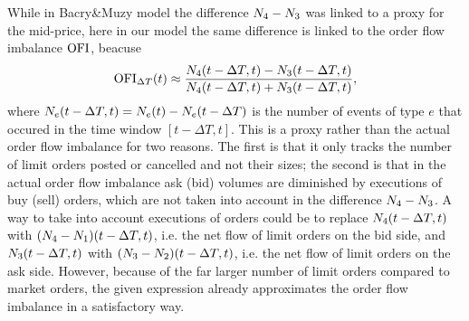 \documentclass[10pt, article,table]{article}
\begin{document}
While in Bacry\&Muzy model the difference $\countingProc[4] - \countingProc[3]$ was linked to a proxy for the mid-price, here in our model the same difference is linked to the order flow imbalance $\orderFlowImbalance$, beacuse 
\begin{equation*}
 \orderFlowImbalance_{\Delta T}(t) \approx  \frac{\countingProc[4](t-\Delta T,t)-\countingProc[3](t-\Delta T,t)}{\countingProc[4](t-\Delta T,t) + \countingProc[3](t-\Delta T,t)},
\end{equation*}
where $\countingProc(t-\Delta T, t) = \countingProc(t) - \countingProc(t-\Delta T)$ is the number of  events of type $e$ that occured in the time window $[t-\Delta T, t]$. This is a proxy rather than the actual order flow imbalance for two reasons. The first is that it only tracks the number of limit orders posted or cancelled and not their sizes; the second is that  in the actual order flow imbalance ask (bid) volumes are diminished by executions of buy (sell) orders, which are not taken into account in the difference $\countingProc[4] - \countingProc[3]$. A way to take into account executions of orders could be to replace $\countingProc[4](t-\Delta T, t)$ with $(\countingProc[4]-\countingProc[1])(t-\Delta T, t)$, i.e.  the net flow of limit orders on the bid side, and $\countingProc[3](t-\Delta T, t)$ with $(\countingProc[3]-\countingProc[2])(t-\Delta T, t)$, i.e.  the net flow of limit orders on the ask side. However, because of the far larger number of limit orders compared to market orders, the given expression already approximates the order flow imbalance in a satisfactory way. 
\end{document}
